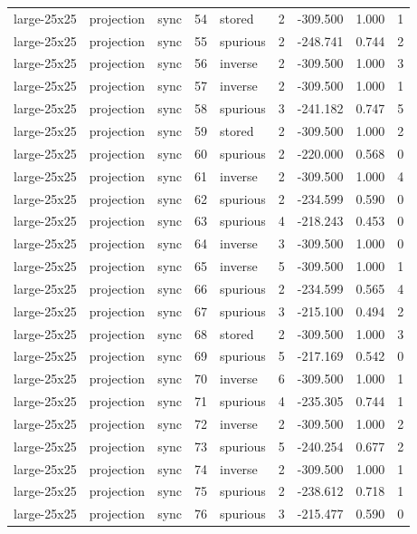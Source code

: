 \begin{tabular}{lllrlrrrr}
large-25x25 & projection & sync & 54 & stored & 2 & -309.500 & 1.000 & 1 \\
large-25x25 & projection & sync & 55 & spurious & 2 & -248.741 & 0.744 & 2 \\
large-25x25 & projection & sync & 56 & inverse & 2 & -309.500 & 1.000 & 3 \\
large-25x25 & projection & sync & 57 & inverse & 2 & -309.500 & 1.000 & 1 \\
large-25x25 & projection & sync & 58 & spurious & 3 & -241.182 & 0.747 & 5 \\
large-25x25 & projection & sync & 59 & stored & 2 & -309.500 & 1.000 & 2 \\
large-25x25 & projection & sync & 60 & spurious & 2 & -220.000 & 0.568 & 0 \\
large-25x25 & projection & sync & 61 & inverse & 2 & -309.500 & 1.000 & 4 \\
large-25x25 & projection & sync & 62 & spurious & 2 & -234.599 & 0.590 & 0 \\
large-25x25 & projection & sync & 63 & spurious & 4 & -218.243 & 0.453 & 0 \\
large-25x25 & projection & sync & 64 & inverse & 3 & -309.500 & 1.000 & 0 \\
large-25x25 & projection & sync & 65 & inverse & 5 & -309.500 & 1.000 & 1 \\
large-25x25 & projection & sync & 66 & spurious & 2 & -234.599 & 0.565 & 4 \\
large-25x25 & projection & sync & 67 & spurious & 3 & -215.100 & 0.494 & 2 \\
large-25x25 & projection & sync & 68 & stored & 2 & -309.500 & 1.000 & 3 \\
large-25x25 & projection & sync & 69 & spurious & 5 & -217.169 & 0.542 & 0 \\
large-25x25 & projection & sync & 70 & inverse & 6 & -309.500 & 1.000 & 1 \\
large-25x25 & projection & sync & 71 & spurious & 4 & -235.305 & 0.744 & 1 \\
large-25x25 & projection & sync & 72 & inverse & 2 & -309.500 & 1.000 & 2 \\
large-25x25 & projection & sync & 73 & spurious & 5 & -240.254 & 0.677 & 2 \\
large-25x25 & projection & sync & 74 & inverse & 2 & -309.500 & 1.000 & 1 \\
large-25x25 & projection & sync & 75 & spurious & 2 & -238.612 & 0.718 & 1 \\
large-25x25 & projection & sync & 76 & spurious & 3 & -215.477 & 0.590 & 0 \\

\end{tabular}
